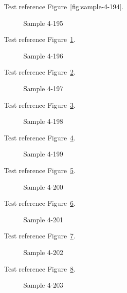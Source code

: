 Test reference Figure~\ref{fig:sample-4-194}.

\begin{figure}[tbhp]
\caption{Sample 4-195}
\label{fig:sample-4-195}
\end{figure}

Test reference Figure~\ref{fig:sample-4-195}.

\begin{figure}[tbhp]
\caption{Sample 4-196}
\label{fig:sample-4-196}
\end{figure}

Test reference Figure~\ref{fig:sample-4-196}.

\begin{figure}[tbhp]
\caption{Sample 4-197}
\label{fig:sample-4-197}
\end{figure}

Test reference Figure~\ref{fig:sample-4-197}.

\begin{figure}[tbhp]
\caption{Sample 4-198}
\label{fig:sample-4-198}
\end{figure}

Test reference Figure~\ref{fig:sample-4-198}.

\begin{figure}[tbhp]
\caption{Sample 4-199}
\label{fig:sample-4-199}
\end{figure}

Test reference Figure~\ref{fig:sample-4-199}.

\begin{figure}[tbhp]
\caption{Sample 4-200}
\label{fig:sample-4-200}
\end{figure}

Test reference Figure~\ref{fig:sample-4-200}.

\begin{figure}[tbhp]
\caption{Sample 4-201}
\label{fig:sample-4-201}
\end{figure}

Test reference Figure~\ref{fig:sample-4-201}.

\begin{figure}[tbhp]
\caption{Sample 4-202}
\label{fig:sample-4-202}
\end{figure}

Test reference Figure~\ref{fig:sample-4-202}.

\begin{figure}[tbhp]
\caption{Sample 4-203}
\label{fig:sample-4-203}
\end{figure}

